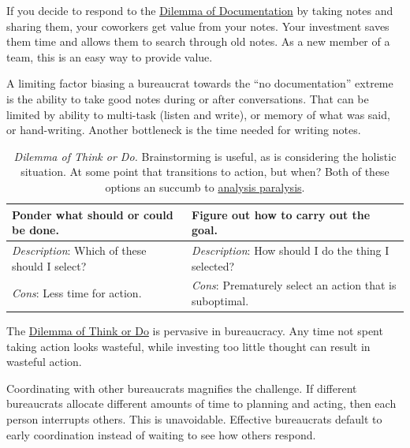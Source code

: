 If you decide to respond to the \href{table:notes-or-no-notes}{Dilemma of Documentation} by taking notes and sharing them, your coworkers get value from your notes. Your investment saves them time and allows them to search through old notes. 
As a new member of a team, this is an easy way to provide value.  

A limiting factor biasing a bureaucrat towards the ``no documentation'' extreme is the ability to take good notes during or after conversations. That can be limited by ability to multi-task (listen and write), or memory of what was said, or hand-writing. Another bottleneck is the time needed for writing notes.

\begin{center}
\begin{table}[H] %
\begin{tabular}{ | m{\dilemmatablewidth}| m{\dilemmatablewidth} | } 
  \hline
  \textbf{Ponder what should or could be done.} &
  \textbf{Figure out how to carry out the goal.}\\
  \hline
  \textit{Description}: Which of these should I select? & 
  \textit{Description}: How should I do the thing I selected? \\
  \hline
  \textit{Cons}: Less time for action. & 
  \textit{Cons}: Prematurely select an action that is suboptimal. \\
  \hline
\end{tabular}
\caption{\textit{Dilemma of Think or Do.}
Brainstorming is useful, as is considering the holistic situation. At some point that transitions to action, but when? %
Both of these options an succumb to \href{https://en.wikipedia.org/wiki/Analysis_paralysis}{analysis paralysis}.
}
\label{table:forest-vs-trees}
\end{table}
\end{center}

The \href{table:forest-vs-trees}{Dilemma of Think or Do} is pervasive in bureaucracy. Any time not spent taking action looks wasteful, while investing too little thought can result in wasteful action. 

Coordinating with other bureaucrats magnifies the challenge. If different bureaucrats allocate different amounts of time to planning and acting, then each person interrupts others. This is unavoidable. Effective bureaucrats default to early coordination instead of waiting to see how others respond.

